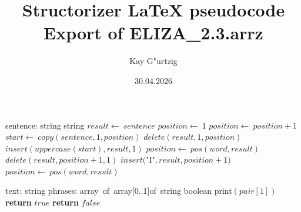 \documentclass[a4paper,10pt]{article}
\title{Structorizer LaTeX pseudocode Export of ELIZA\_2.3.arrz}
\author{Kay G"urtzig}
\date{30.04.2026}
\begin{document}
\begin{algorithm}
\caption{adjustSpelling(1)}
\begin{algorithmic}[5]
\State {}
    \State sentence: string
  \EndDecl
    \State string
  \EndDecl
  \State \(result\gets\ sentence\)
  \State \(position\gets\ 1\)
    \State \(position\gets\ position+1\)
  \EndWhile
    \State \(start\gets\ copy(sentence,1,position)\)
    \State \(delete(result,1,position)\)
    \State \(insert(uppercase(start),result,1)\)
  \EndIf
    \State \(position\gets\ pos(word,result)\)
      \State \(delete(result,position+1,1)\)
      \State \(insert(\)"{}I"{}\(,result,position+1)\)
      \State \(position\gets\ pos(word,result)\)
    \EndWhile
  \EndFor
\EndFunction
\end{algorithmic}
\end{algorithm}


\begin{algorithm}
\caption{checkGoodBye(2)}
\begin{algorithmic}[5]
\State {}
\State {}
\State {}
\State {}
    \State text: string
    \State phrases: array\ of\ array[0..1]of\ string
  \EndDecl
    \State boolean
  \EndDecl
      \State \(\)print\((pair[1])\)
      \State \textbf{return} \(true\)
    \EndIf
  \EndFor
  \State \textbf{return} \(false\)
\EndFunction
\end{algorithmic}
\end{algorithm}
\end{document}
